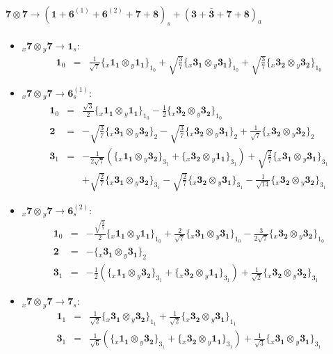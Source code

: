 \documentclass[english]{article}
\newcommand{\rep}[1]{\mathbf{#1}}
\newcommand{\repx}[2]{{}_{#2}\mathbf{#1}}
\newcommand{\subcg}[3]{\big\{ \repx{#1}{x}\otimes\repx{#2}{y}\big\}^{}_{#3}}
\begin{document}
\paragraph*{\Large $\rep{7}\otimes\rep{7}\to\left(\rep{1}+\rep{6}^{(1)}+\rep{6}^{(2)}+\rep{7}+\rep{8}\right)_s+\left(\rep{3}+\rep{\bar{3}}+\rep{7}+\rep{8}\right)_a$}
\begin{itemize}
\item $\repx{7}{x}\otimes\repx{7}{y}\to\rep{1}_{s}$:
\begin{eqnarray*}
\rep{1}_{0} &=& \frac{1}{\sqrt{7}}\subcg{1_{1}}{1_{1}}{1_{0}}+\sqrt{\frac{3}{7}}\subcg{3_{1}}{3_{1}}{1_{0}}+\sqrt{\frac{3}{7}}\subcg{3_{2}}{3_{2}}{1_{0}}
\end{eqnarray*}
\item $\repx{7}{x}\otimes\repx{7}{y}\to\rep{6}_{s}^{(1)}$:
\begin{eqnarray*}
\rep{1}_{0} &=& \frac{\sqrt{3}}{2}\subcg{1_{1}}{1_{1}}{1_{0}}-\frac{1}{2}\subcg{3_{2}}{3_{2}}{1_{0}}
\\
\rep{2} &=& -\sqrt{\frac{3}{7}}\subcg{3_{1}}{3_{2}}{2}-\sqrt{\frac{3}{7}}\subcg{3_{2}}{3_{1}}{2}+\frac{1}{\sqrt{7}}\subcg{3_{2}}{3_{2}}{2}
\\
\rep{3}_{1} &=& -\frac{1}{2 \sqrt{7}}\left(\subcg{1_{1}}{3_{2}}{3_{1}}+\subcg{3_{2}}{1_{1}}{3_{1}}\right)+\sqrt{\frac{2}{7}}\subcg{3_{1}}{3_{1}}{3_{1}} \\ 
 & & +\sqrt{\frac{2}{7}}\subcg{3_{1}}{3_{2}}{3_{1}}-\sqrt{\frac{2}{7}}\subcg{3_{2}}{3_{1}}{3_{1}}-\frac{1}{\sqrt{14}}\subcg{3_{2}}{3_{2}}{3_{1}}
\end{eqnarray*}
\item $\repx{7}{x}\otimes\repx{7}{y}\to\rep{6}_{s}^{(2)}$:
\begin{eqnarray*}
\rep{1}_{0} &=& -\frac{\sqrt{\frac{3}{7}}}{2}\subcg{1_{1}}{1_{1}}{1_{0}}+\frac{2}{\sqrt{7}}\subcg{3_{1}}{3_{1}}{1_{0}}-\frac{3}{2 \sqrt{7}}\subcg{3_{2}}{3_{2}}{1_{0}}
\\
\rep{2} &=& -\subcg{3_{1}}{3_{1}}{2}
\\
\rep{3}_{1} &=& -\frac{1}{2}\left(\subcg{1_{1}}{3_{2}}{3_{1}}+\subcg{3_{2}}{1_{1}}{3_{1}}\right)+\frac{1}{\sqrt{2}}\subcg{3_{2}}{3_{2}}{3_{1}}
\end{eqnarray*}
\item $\repx{7}{x}\otimes\repx{7}{y}\to\rep{7}_{s}$:
\begin{eqnarray*}
\rep{1}_{1} &=& \frac{1}{\sqrt{2}}\subcg{3_{1}}{3_{2}}{1_{1}}+\frac{1}{\sqrt{2}}\subcg{3_{2}}{3_{1}}{1_{1}}
\\
\rep{3}_{1} &=& \frac{1}{\sqrt{6}}\left(\subcg{1_{1}}{3_{2}}{3_{1}}+\subcg{3_{2}}{1_{1}}{3_{1}}\right)+\frac{1}{\sqrt{3}}\subcg{3_{1}}{3_{1}}{3_{1}} \\ 

\end{eqnarray*}
\end{itemize}
\end{document}
